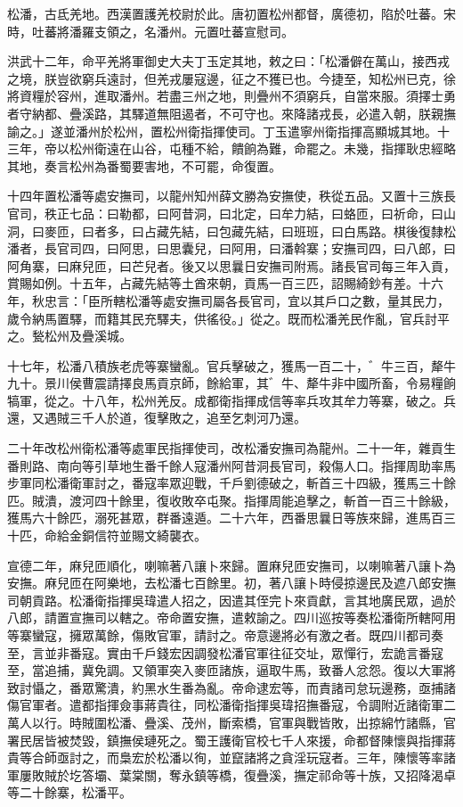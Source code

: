 \begin{pinyinscope}
松潘，古氐羌地。西漢置護羌校尉於此。唐初置松州都督，廣德初，陷於吐蕃。宋時，吐蕃將潘羅支領之，名潘州。元置吐蕃宣慰司。

洪武十二年，命平羌將軍御史大夫丁玉定其地，敕之曰：「松潘僻在萬山，接西戎之境，朕豈欲窮兵遠討，但羌戎屢寇邊，征之不獲已也。今捷至，知松州已克，徐將資糧於容州，進取潘州。若盡三州之地，則疊州不須窮兵，自當來服。須擇士勇者守納都、疊溪路，其驛道無阻遏者，不可守也。來降諸戎長，必遣入朝，朕親撫諭之。」遂並潘州於松州，置松州衛指揮使司。丁玉遣寧州衛指揮高顯城其地。十三年，帝以松州衛遠在山谷，屯種不給，饋餉為難，命罷之。未幾，指揮耿忠經略其地，奏言松州為番蜀要害地，不可罷，命復置。

十四年置松潘等處安撫司，以龍州知州薛文勝為安撫使，秩從五品。又置十三族長官司，秩正七品：曰勒都，曰阿昔洞，曰北定，曰牟力結，曰蛒匝，曰祈命，曰山洞，曰麥匝，曰者多，曰占藏先結，曰包藏先結，曰班班，曰白馬路。棋後復隸松潘者，長官司四，曰阿思，曰思囊兒，曰阿用，曰潘斡寨；安撫司四，曰八郎，曰阿角寨，曰麻兒匝，曰芒兒者。後又以思曩日安撫司附焉。諸長官司每三年入貢，賞賜如例。十五年，占藏先結等土酋來朝，貢馬一百三匹，詔賜綺鈔有差。十六年，秋忠言：「臣所轄松潘等處安撫司屬各長官司，宜以其戶口之數，量其民力，歲令納馬置驛，而籍其民充驛夫，供徭役。」從之。既而松潘羌民作亂，官兵討平之。甃松州及疊溪城。

十七年，松潘八積族老虎等寨蠻亂。官兵擊破之，獲馬一百二十，゛牛三百，犛牛九十。景川侯曹震請擇良馬貢京師，餘給軍，其゛牛、犛牛非中國所畜，令易糧餉犒軍，從之。十八年，松州羌反。成都衛指揮成信等率兵攻其牟力等寨，破之。兵還，又遇賊三千人於道，復擊敗之，追至乞刺河乃還。

二十年改松州衛松潘等處軍民指揮使司，改松潘安撫司為龍州。二十一年，雜貢生番則路、南向等引草地生番千餘人寇潘州阿昔洞長官司，殺傷人口。指揮周助率馬步軍同松潘衛軍討之，番寇率眾迎戰，千戶劉德破之，斬首三十四級，獲馬三十餘匹。賊潰，渡河四十餘里，復收敗卒屯聚。指揮周能追擊之，斬首一百三十餘級，獲馬六十餘匹，溺死甚眾，群番遠遁。二十六年，西番思曩日等族來歸，進馬百三十匹，命給金銅信符並賜文綺襲衣。

宣德二年，麻兒匝順化，喇嘛著八讓卜來歸。置麻兒匝安撫司，以喇嘛著八讓卜為安撫。麻兒匝在阿樂地，去松潘七百餘里。初，著八讓卜時侵掠邊民及遮八郎安撫司朝貢路。松潘衛指揮吳瑋遣人招之，因遣其侄完卜來貢獻，言其地廣民眾，過於八郎，請置宣撫司以轄之。帝命置安撫，遣敕諭之。四川巡按等奏松潘衛所轄阿用等寨蠻寇，擁眾萬餘，傷敗官軍，請討之。帝意邊將必有激之者。既四川都司奏至，言並非番寇。實由千戶錢宏因調發松潘官軍往征交址，眾憚行，宏詭言番寇至，當追捕，冀免調。又領軍突入麥匝諸族，逼取牛馬，致番人忿怨。復以大軍將致討懾之，番眾驚潰，約黑水生番為亂。帝命逮宏等，而責諸司怠玩邊務，亟捕諸傷官軍者。遣都指揮僉事蔣貴往，同松潘衛指揮吳瑋招撫番寇，令調附近諸衛軍二萬人以行。時賊圍松潘、疊溪、茂州，斷索橋，官軍與戰皆敗，出掠綿竹諸縣，官署民居皆被焚毀，鎮撫侯璉死之。蜀王護衛官校七千人來援，命都督陳懷與指揮蔣貴等合師亟討之，而梟宏於松潘以徇，並竄諸將之貪淫玩寇者。三年，陳懷等率諸軍屢敗賊於圪答壩、葉棠關，奪永鎮等橋，復疊溪，撫定祁命等十族，又招降渴卓等二十餘寨，松潘平。


\end{pinyinscope}

